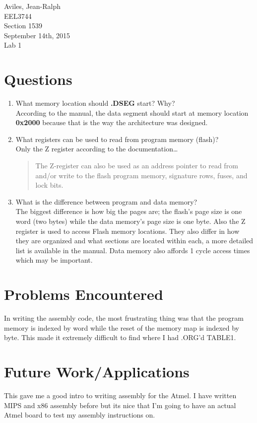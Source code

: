 \documentclass[letterpaper, 12pt]{article}
\newcommand{\hwnumber}{Lab 1}
\newcommand{\duedate}{September 14th, 2015}
\newcommand{\capper}{\begin{flushright}Aviles, Jean-Ralph \\ EEL3744 \\ Section 1539 \\ \duedate{} \\ \hwnumber{}\end{flushright}}
\begin{document}
\capper{}
\section*{Questions}
\begin{enumerate}
\item What memory location should \textbf{.DSEG} start? Why? \\
\hspace*{8pt} According to the manual, the data segment should start at memory location \textbf{0x2000} because that is the way the architecture was designed.
\item What registers can be used to read from program memory (flash)? \\
\hspace*{8pt} Only the Z register according to the documentation\ldots
\begin{quote}
The Z-register can also be used as an address pointer to read from and/or write
to the flash program memory, signature rows, fuses, and lock bits.
\end{quote}
\item What is the difference between program and data memory? \\
\hspace*{8pt} The biggest difference is how big the pages are; the flash's page size is one word (two bytes) while the data memory's page size is one byte. Also the Z register is used to access Flash memory locations. They also differ in how they are organized and what sections are located within each, a more detailed list is available in the manual. Data memory also affords 1 cycle access times which may be important.
\end{enumerate}
\section*{Problems Encountered}
In writing the assembly code, the most frustrating thing was that the program memory is indexed by word while the reset of the memory map is indexed by byte. This made it extremely difficult to find where I had .ORG'd TABLE1.
\section*{Future Work/Applications}
This gave me a good intro to writing assembly for the Atmel. I have written MIPS and x86 assembly before but its nice that I'm going to have an actual Atmel board to test my assembly instructions on.
\pagebreak[4]
\end{document}
